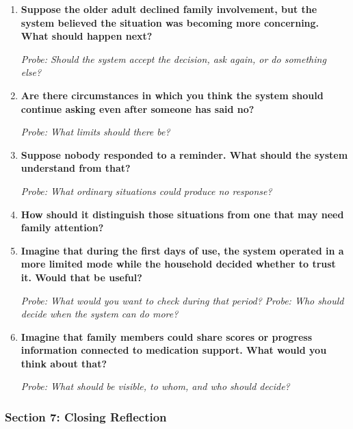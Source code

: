 \begin{enumerate}[resume]
  \item \textbf{Suppose the older adult declined family involvement, but the system believed the situation was becoming more concerning. What should happen next?}

  \textit{Probe: Should the system accept the decision, ask again, or do something else?}
  \item \textbf{Are there circumstances in which you think the system should continue asking even after someone has said no?}

  \textit{Probe: What limits should there be?}
  \item \textbf{Suppose nobody responded to a reminder. What should the system understand from that?}

  \textit{Probe: What ordinary situations could produce no response?}
  \item \textbf{How should it distinguish those situations from one that may need family attention?}
  \item \textbf{Imagine that during the first days of use, the system operated in a more limited mode while the household decided whether to trust it. Would that be useful?}

  \textit{Probe: What would you want to check during that period?} \textit{Probe: Who should decide when the system can do more?}
  \item \textbf{Imagine that family members could share scores or progress information connected to medication support. What would you think about that?}

  \textit{Probe: What should be visible, to whom, and who should decide?}
\end{enumerate}

\subsubsection{Section 7: Closing Reflection}

